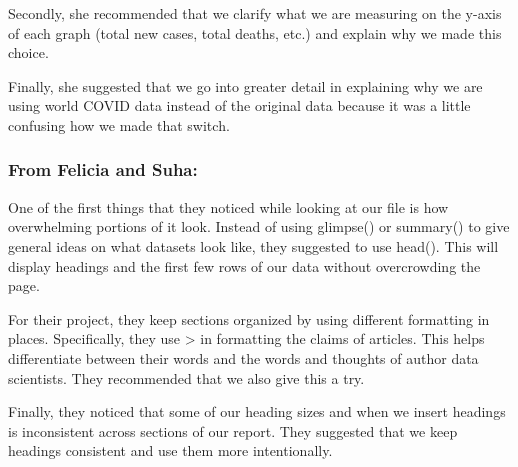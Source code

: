 \documentclass[
]{article}
\begin{document}
Secondly, she recommended that we clarify what we are measuring on the
y-axis of each graph (total new cases, total deaths, etc.) and explain
why we made this choice.

Finally, she suggested that we go into greater detail in explaining why
we are using world COVID data instead of the original data because it
was a little confusing how we made that switch.

\hypertarget{from-felicia-and-suha}{%
\subsubsection{From Felicia and Suha:}\label{from-felicia-and-suha}}

One of the first things that they noticed while looking at our file is
how overwhelming portions of it look. Instead of using glimpse() or
summary() to give general ideas on what datasets look like, they
suggested to use head(). This will display headings and the first few
rows of our data without overcrowding the page.

For their project, they keep sections organized by using different
formatting in places. Specifically, they use \textgreater{} in
formatting the claims of articles. This helps differentiate between
their words and the words and thoughts of author data scientists. They
recommended that we also give this a try.

Finally, they noticed that some of our heading sizes and when we insert
headings is inconsistent across sections of our report. They suggested
that we keep headings consistent and use them more intentionally.
\end{document}
